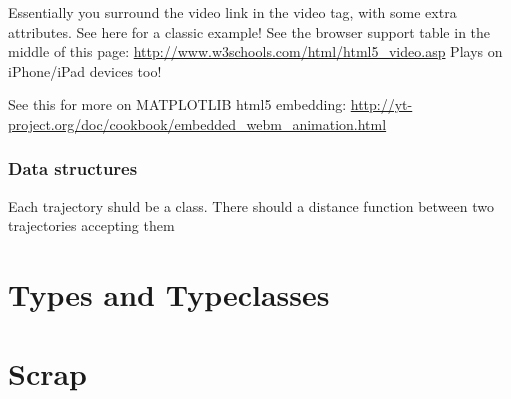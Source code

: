 \documentclass[11pt]{article}
\begin{document}
Essentially you surround the video link in the video tag, with some extra attributes. See here for a classic example! 
See the browser support table in the middle of this page: \url{http://www.w3schools.com/html/html5_video.asp} 
Plays on iPhone/iPad devices too!

See this for more on MATPLOTLIB html5 embedding: \url{http://yt-project.org/doc/cookbook/embedded_webm_animation.html}

\subsubsection{Data structures}
\label{sec-4-1-2}
Each trajectory shuld be a class. 
There should a distance function between two trajectories accepting them

\section{Types and Typeclasses}
\label{sec-5}


\section{Scrap}
\label{sec-6}
\end{document}
